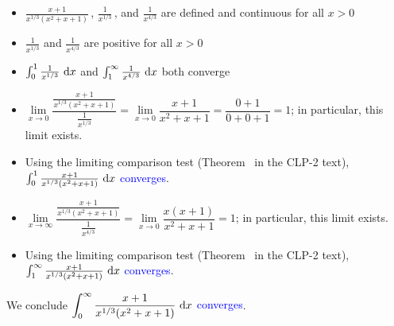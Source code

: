 \begin{solution}
\begin{itemize}
\item $\frac{x+1}{x^{1/3}(x^2+x+1)}$\,, $\frac{1}{x^{1/3}}$\,, and $\frac{1}{x^{4/3}}$ are defined and continuous for all $x > 0$
\item $\frac{1}{x^{1/3}}$ and $\frac{1}{x^{4/3}}$ are positive for all $x>0$
\item $\int_0^1  \frac{1}{x^{1/3}}~\mathrm{d}x$ and $\int_1^\infty  \frac{1}{x^{4/3}}~\mathrm{d}x$ both converge
\item $\lim\limits_{x \to 0}\dfrac{\frac{x+1}{x^{1/3}(x^2+x+1)}}{\frac{1}{x^{1/3}}}
=\lim\limits_{x \to 0}\dfrac{x+1}{x^2+x+1}=\dfrac{0+1}{0+0+1}=1
$; in particular, this limit exists.
\item Using the limiting comparison test (Theorem~
 in the CLP-2 text), \textcolor{blue}{
$\int_0^1 \frac{x+1}{x^{1/3}(x^2+x+1)}~\mathrm{d}x$ converges}.
\item $\lim\limits_{x \to \infty}\dfrac{\frac{x+1}{x^{1/3}(x^2+x+1)}}{\frac{1}{x^{4/3}}}
=\lim\limits_{x \to 0}\dfrac{x(x+1)}{x^2+x+1}=1
$; in particular, this limit exists.
\item Using the limiting comparison test (Theorem~
 in the CLP-2 text), \textcolor{blue}{
$\int_1^\infty \frac{x+1}{x^{1/3}(x^2+x+1)}~\mathrm{d}x$ converges}.
\end{itemize}

We conclude \textcolor{blue}{
$\displaystyle\int_0^\infty \frac{x+1}{x^{1/3}(x^2+x+1)}~\mathrm{d}x$ converges}.
\end{solution}



\subsection*{\Application}

